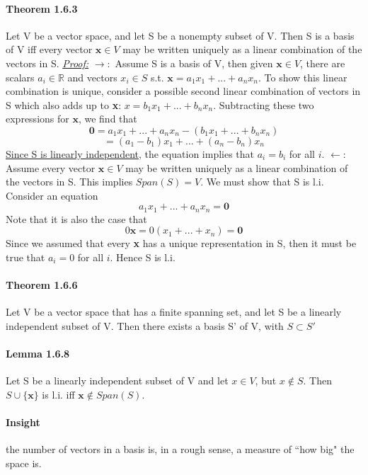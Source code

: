 \documentclass[11pt]{article}
\newcommand{\ti}[1]{\textit{#1}}
\newcommand{\tb}[1]{\textbf{#1}}
\newcommand{\mb}[1]{\mathbb{#1}}
\newcommand{\under}[1]{\underline{#1}}
\begin{document}
	\paragraph{Theorem 1.6.3} Let V be a vector space, and let S be a nonempty subset of V. Then S is a basis of V iff every vector $\tb{x} \in V$ may be written uniquely as a linear combination of the vectors in S. \newline
	\under{\ti{Proof:}}
	$\rightarrow:$ Assume  S is a basis of V, then given $\tb{x} \in V$, there are scalars $a_i \in \mb{R}$ and vectors $x_i \in S$ s.t. $\tb{x} = a_1x_1 + ... + a_nx_n$. To show this linear combination is unique, consider a possible second linear combination of vectors in S which also adds up to \tb{x}: $x= b_1x_1 + ...+b_nx_n$. Subtracting these two expressions for $\tb{x}$, we find that
	$$\tb{0} = a_1x_1 + ... + a_nx_n - (b_1x_1 + ...+b_nx_n)$$ 
	$$=(a_1 - b_1)x_1 + ...+(a_n-b_n)x_n$$
	\under{Since S is linearly independent}, the equation implies that $a_i = b_i$ for all $i$.\newline\newline
	$\leftarrow$: Assume every vector $\tb{x} \in V$ may be written uniquely as a linear combination of the vectors in S. This implies $Span(S) = V$. We must show that S is l.i. Consider an equation
	$$a_1x_1 +...+a_nx_n = \tb{0}$$
	Note that it is also the case that
	$$0\tb{x} = 0(x_1 + ...+x_n) = \tb{0}$$
	Since we assumed that every \tb{x} has a unique representation in S, then it must be true that $a_i = 0$ for all $i$. Hence S is l.i.
 	\paragraph{Theorem 1.6.6} Let V be a vector space that has a finite spanning set, and let S be a linearly independent subset of V. Then there exists a basis S' of V, with $S \subset S'$
	\paragraph{Lemma 1.6.8} Let S be a linearly independent subset of V and let $x \in V$, but $x \notin S$. Then $S \cup \{\tb{x}\}$ is l.i. iff $\tb{x} \notin Span(S)$.
	\paragraph{Insight} the number of vectors in a basis is, in a rough sense, a measure of ``how big" the space is.
\end{document}

